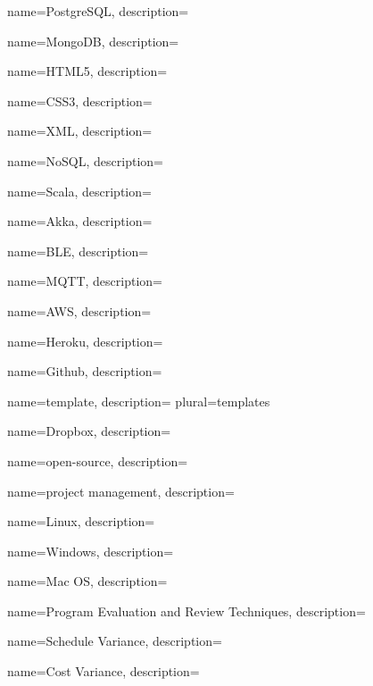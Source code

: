  {
	name=PostgreSQL,
	description={\TODO{}}
}

 {
	name=MongoDB,
	description={\TODO{}}
}

 {
	name=HTML5,
	description={\TODO{}}
}

 {
	name=CSS3,
	description={\TODO{}}
}

 {
	name=XML,
	description={\TODO{}}
}

 {
	name=NoSQL,
	description={\TODO{}}
}

 {
	name=Scala,
	description={\TODO{}}
}

 {
	name=Akka,
	description={\TODO{}}
}

 {
	name=BLE,
	description={\TODO{}}
}

 {
	name=MQTT,
	description={\TODO{}}
}

 {
	name=AWS,
	description={\TODO{}}
}

 {
	name=Heroku,
	description={\TODO{}}
}

 {
	name=Github,
	description={\TODO{}}
}

 {
	name=template,
	description={\TODO{}}
	plural=templates
}

 {
	name=Dropbox,
	description={\TODO{}}
}

 {
	name=open-source,
	description={\TODO{}}
}

 {
	name=project management,
	description={\TODO{}}
}

 {
	name=Linux,
	description={\TODO{}}
}

 {
	name=Windows,
	description={\TODO{}}
}

 {
	name=Mac OS,
	description={\TODO{}}
}

 {
	name=Program Evaluation and Review Techniques,
	description={\TODO{}}
}

 {
	name=Schedule Variance,
	description={\TODO{}}
}

 {
	name=Cost Variance,
	description={\TODO{}}
}

